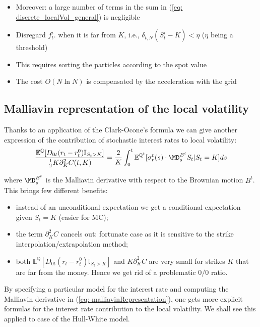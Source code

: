 \smallskip
\begin{itemize}
\item Moreover: a large number of terms in the sum in (\ref{eq: discrete_localVol_general}) is negligible
\item Disregard $f_t^i$. when it is far from $K$, i.e., $\delta_{t,N}(S_t^i-K) < \eta$ ($\eta$ being a threshold)
\item This requires sorting the particles according to the spot value
\item The cost $O(N\ln N)$ is compensated by the acceleration with the grid
\end{itemize}

\subsection{Malliavin representation of the local volatility}\label{subsec: malliavinGeneral}
Thanks to an application of the Clark-Ocone's formula we can give another expression of the contribution of stochastic interest rates to local volatility:
\begin{equation}\label{eq: malliavinRepresentation}
\frac{ \mathbb{E}^{\mathbb{Q}}[ D_{0t}(r_t-r^0_t)\mathbb{I}_{S_t>K} ]}{ \frac{1}{2}K\partial^2_KC(t,K) } = \frac{2}{K}\int _0^t \mathbb{E}^{\mathbb{Q}^t}[\sigma_r^t(s)\cdot \MD _s^{B^t}S_t  |S_t = K ]ds
\end{equation}

where $ \MD_s^{B^t} $ is the Malliavin derivative with respect to the Brownian motion $B^t$.
This brings few different benefits:
\begin{itemize}
\item[1.] instead of an unconditional expectation we get a conditional expectation given $ S_t = K $ (easier for MC);
\item[2.] the term $\partial_K^2C$ cancels out: fortunate case as it is sensitive to the strike interpolation/extrapolation method;
\item[3.] both $\mathbb{E}^{\mathbb{Q}}[ D_{0t}(r_t-r^0_t)\mathbb{I}_{S_t>K} ]$ and $K\partial_K^2C$ are very small for strikes $K$ that are far from the money. Hence we get rid of a problematic $0/0$ ratio.
\end{itemize}
By specifying a particular model for the interest rate and computing the Malliavin derivative in (\ref{eq: malliavinRepresentation}), one gets more explicit formulas for the interest rate contribution to the local volatility.
We shall see this applied to case of the Hull-White model.

